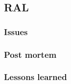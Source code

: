 
\subsection{RAL}
\label{sec:site:ral}

\subsubsection{Issues}
\label{sec:site:ral:Issues}

\subsubsection{Post mortem}
\label{sec:site:ral:postmortem}

\subsubsection{Lessons learned}
\label{sec:site:ral:lessons}
